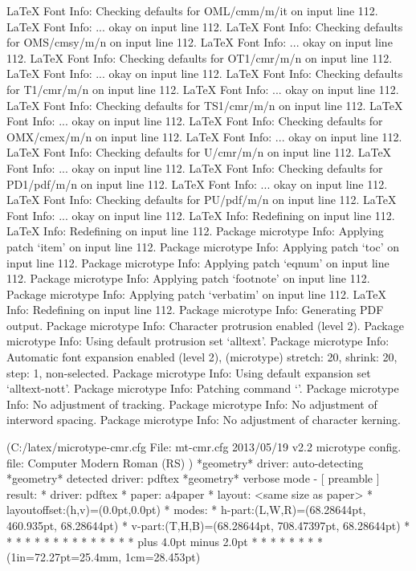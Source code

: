 LaTeX Font Info:    Checking defaults for OML/cmm/m/it on input line 112.
LaTeX Font Info:    ... okay on input line 112.
LaTeX Font Info:    Checking defaults for OMS/cmsy/m/n on input line 112.
LaTeX Font Info:    ... okay on input line 112.
LaTeX Font Info:    Checking defaults for OT1/cmr/m/n on input line 112.
LaTeX Font Info:    ... okay on input line 112.
LaTeX Font Info:    Checking defaults for T1/cmr/m/n on input line 112.
LaTeX Font Info:    ... okay on input line 112.
LaTeX Font Info:    Checking defaults for TS1/cmr/m/n on input line 112.
LaTeX Font Info:    ... okay on input line 112.
LaTeX Font Info:    Checking defaults for OMX/cmex/m/n on input line 112.
LaTeX Font Info:    ... okay on input line 112.
LaTeX Font Info:    Checking defaults for U/cmr/m/n on input line 112.
LaTeX Font Info:    ... okay on input line 112.
LaTeX Font Info:    Checking defaults for PD1/pdf/m/n on input line 112.
LaTeX Font Info:    ... okay on input line 112.
LaTeX Font Info:    Checking defaults for PU/pdf/m/n on input line 112.
LaTeX Font Info:    ... okay on input line 112.
LaTeX Info: Redefining \degres on input line 112.
LaTeX Info: Redefining \microtypecontext on input line 112.
Package microtype Info: Applying patch `item' on input line 112.
Package microtype Info: Applying patch `toc' on input line 112.
Package microtype Info: Applying patch `eqnum' on input line 112.
Package microtype Info: Applying patch `footnote' on input line 112.
Package microtype Info: Applying patch `verbatim' on input line 112.
LaTeX Info: Redefining \microtypesetup on input line 112.
Package microtype Info: Generating PDF output.
Package microtype Info: Character protrusion enabled (level 2).
Package microtype Info: Using default protrusion set `alltext'.
Package microtype Info: Automatic font expansion enabled (level 2),
(microtype)             stretch: 20, shrink: 20, step: 1, non-selected.
Package microtype Info: Using default expansion set `alltext-nott'.
Package microtype Info: Patching command `\showhyphens'.
Package microtype Info: No adjustment of tracking.
Package microtype Info: No adjustment of interword spacing.
Package microtype Info: No adjustment of character kerning.

(C:\MikTeX\tex/latex/microtype\mt-cmr.cfg
File: mt-cmr.cfg 2013/05/19 v2.2 microtype config. file: Computer Modern Roman 
(RS)
)
*geometry* driver: auto-detecting
*geometry* detected driver: pdftex
*geometry* verbose mode - [ preamble ] result:
* driver: pdftex
* paper: a4paper
* layout: <same size as paper>
* layoutoffset:(h,v)=(0.0pt,0.0pt)
* modes: 
* h-part:(L,W,R)=(68.28644pt, 460.935pt, 68.28644pt)
* v-part:(T,H,B)=(68.28644pt, 708.47397pt, 68.28644pt)
* \paperwidth=597.50787pt
* \paperheight=845.04684pt
* \textwidth=460.935pt
* \textheight=708.47397pt
* \oddsidemargin=-3.98355pt
* \evensidemargin=-3.98355pt
* \topmargin=-52.98355pt
* \headheight=24.0pt
* \headsep=25.0pt
* \topskip=11.0pt
* \footskip=30.0pt
* \marginparwidth=50.0pt
* \marginparsep=10.0pt
* \columnsep=10.0pt
* \skip\footins=10.0pt plus 4.0pt minus 2.0pt
* \hoffset=0.0pt
* \voffset=0.0pt
* 
* \@twocolumnfalse
* \@twosidefalse
* \@mparswitchfalse
* \@reversemarginfalse
* (1in=72.27pt=25.4mm, 1cm=28.453pt)

